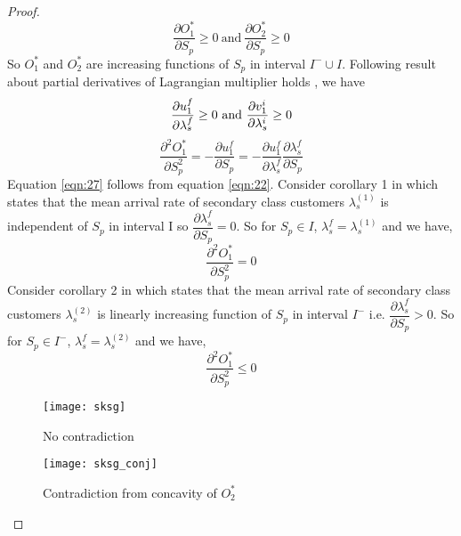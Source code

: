 \documentclass[12pt, a4paper]{report}
\begin{document}
\begin{proof}
\begin{equation}\label{eqn:25}
\dfrac{\partial O_1^*}{\partial S_p} \geq 0~\text{and}~\dfrac{\partial O_2^*}{\partial S_p} \geq 0
\end{equation}
So $O_1^*$ and $O_2^*$ are increasing functions of $S_p$ in interval $I^-\cup I$. Following result about partial derivatives of Lagrangian multiplier holds \cite{Sudhir_standard_style}, we have 
\begin{equation}
\dfrac{\partial u_1^f}{\partial \lambda_s^f} \geq 0~\text{and}~\dfrac{\partial v_1^i}{\partial \lambda_s^i} \geq 0\\
\end{equation}
\begin{equation}\label{eqn:27}
\dfrac{\partial^2 O_1^*}{\partial S_p^2} = -\dfrac{\partial u_1^f}{\partial S_p} = -\dfrac{\partial u_1^f}{\partial \lambda_s^f}\dfrac{\partial \lambda_s^f}{\partial S_p}
\end{equation}
Equation \ref{eqn:27} follows from equation \ref{eqn:22}. Consider corollary 1 in \cite{Sudhir_standard_style} which states that the mean arrival rate of secondary class customers $\lambda_s^{(1)}$ is independent of $S_p$ in interval I so $\dfrac{\partial \lambda_s^f}{\partial S_p} = 0$. So for $S_p \in I$, $\lambda_s^f = \lambda_s^{(1)}$ and we have,
\begin{equation}\label{eqn:28}
\dfrac{\partial^2 O_1^*}{\partial S_p^2} =0 
\end{equation}
Consider corollary 2 in \cite{Sudhir_standard_style} which states that the mean arrival rate of secondary class customers $\lambda_s^{(2)}$ is linearly increasing function of $S_p$ in interval $I^-$ i.e. $\dfrac{\partial \lambda_s^f}{\partial S_p} > 0$. So for $S_p \in I^-$, $\lambda_s^f = \lambda_s^{(2)}$ and we have,
\begin{equation}\label{eqn:29}
\dfrac{\partial^2 O_1^*}{\partial S_p^2} \leq 0 
\end{equation}
\begin{figure}[ht]
\begin{minipage}[b]{0.5\textwidth}
\texttt{[image: sksg]}\label{fig:5}
\caption{No contradiction } \label{fig:lambda_svssigma}
\end{minipage}
\hspace{0.5cm}
\begin{minipage}[b]{0.5\textwidth}
\centering
\texttt{[image: sksg\_conj]}\label{fig:6}
\caption{Contradiction from concavity of $O_2^* $}
\end{minipage}
\end{figure}


\end{proof}
\end{document}
